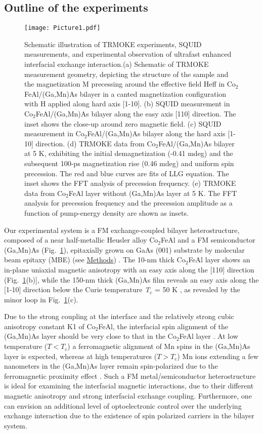 \documentclass[%
 reprint,
superscriptaddress,
 amsmath,amssymb,
 aps,
prl,
]{revtex4-1}
\begin{document}
\subsection{Outline of the experiments}

\begin{figure}
    \centering
    \advance\leftskip-1cm
    \advance\rightskip-0cm
    \texttt{[image: Picture1.pdf]}
    \caption{Schematic illustration of TRMOKE experiments, SQUID measurements, and experimental observation of ultrafast enhanced interfacial exchange interaction.(a) Schematic of TRMOKE measurement geometry, depicting the structure of the sample and the magnetization M precessing around the effective field Heff in Co$_2$FeAl/(Ga,Mn)As bilayer in a canted magnetization configuration with H applied along hard axis [1-10]. (b) SQUID measurement in Co$_2$FeAl/(Ga,Mn)As bilayer along the easy axis [110] direction. The inset shows the close-up around zero magnetic field. (c) SQUID measurement in Co$_2$FeAl/(Ga,Mn)As bilayer along the hard axis [1-10] direction. (d) TRMOKE data from Co$_2$FeAl/(Ga,Mn)As bilayer at 5 K, exhibiting the initial demagnetization (-0.41 mdeg) and the subsequent 100-ps magnetization rise (0.46 mdeg) and uniform spin precession. The red and blue curves are fits of LLG equation. The inset shows the FFT analysis of precession frequency. (e) TRMOKE data from Co$_2$FeAl layer without (Ga,Mn)As layer at 5 K. The FFT analysis for precession frequency and the precession amplitude as a function of pump-energy density are shown as insets.
}
    \label{fig:Fig1}
\end{figure}

Our experimental system is a FM exchange-coupled bilayer heterostructure, composed of a near half-metallic Heusler alloy Co$_2$FeAl and a FM semiconductor (Ga,Mn)As (Fig.~\ref{fig:Fig1}), epitaxially grown on GaAs (001) substrate by molecular beam epitaxy (MBE) (see \hyperref[sec:Methods]{Methods}) \cite{24}. The 10-nm thick Co$_2$FeAl layer shows an in-plane uniaxial magnetic anisotropy with an easy axis along the [110] direction (Fig.~\ref{fig:Fig1}(b)], while the 150-nm thick (Ga,Mn)As film reveals an easy axis along the [1-10] direction below the Curie temperature \textit{T$_c$} = 50 K \cite{24}, as revealed by the minor loop in Fig.~\ref{fig:Fig1}(c). 

Due to the strong coupling at the interface and the relatively strong cubic anisotropy constant K1 of Co$_2$FeAl, the interfacial spin alignment of the (Ga,Mn)As layer should be very close to that in the Co$_2$FeAl layer \cite{24}. At low temperature ($T < T_{c}$) a ferromagnetic alignment of Mn spins in the (Ga,Mn)As layer is expected, whereas at high temperatures ($T > T_{c}$) Mn ions extending a few nanometers in the (Ga,Mn)As layer remain spin-polarized due to the ferromagnetic proximity effect \cite{24}. Such a FM metal/semiconductor heterostructure is ideal for examining the interfacial magnetic interactions, due to their different magnetic anisotropy and strong interfacial exchange coupling. Furthermore, one can envision an additional level of optoelectronic control over the underlying exchange interaction due to the existence of spin polarized carriers in the bilayer system. 
\end{document}
